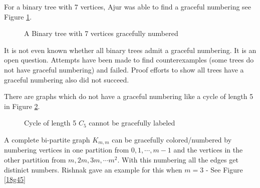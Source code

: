 For a binary tree with 7 vertices, Ajur was able to find a graceful numbering see Figure \ref{19g3}.

\begin{figure}
\begin{center}


\caption{A Binary tree with 7 vertices gracefully numbered }\label{19g3}
\end{center}
\end{figure}

It is not even known whether all binary trees admit a graceful numbering. It is an open question. Attempts have been made to find counterexamples (some trees do not have graceful numbering) and failed. Proof efforts to show all trees have a graceful numbering also did not succeed.
  
  There are graphs which do not have a graceful numbering like a cycle of length 5 in  Figure \ref{19g4}.

\begin{figure}
\begin{center}


\caption{Cycle of length 5 $C_5$ cannot be gracefully labeled }\label{19g4}
\end{center}
\end{figure}

A complete bi-partite graph $K_{m,m}$ can be gracefully colored/numbered by numbering vertices in one partition from $0,1,\cdots,m-1$ and the vertices
in the other partition from $m,2m,3m,\cdots m^2$. With this numbering all the edges get distinict numbers. Rishnak gave an example for this when $m=3$ - See Figure \ref{18g45}


